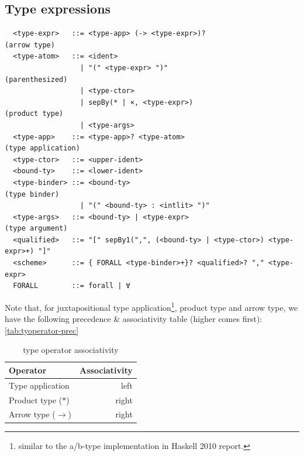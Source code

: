 \documentclass[a4paper, 11pt]{article}
\theoremstyle{remark}\newtheorem*{remark}{Remark}
\theoremstyle{definition}\newtheorem*{definition}{Definition}
\begin{document}
\subsection{Type expressions}
\begin{verbatim}
  <type-expr>   ::= <type-app> (-> <type-expr>)?                                 (arrow type)
  <type-atom>   ::= <ident>
                  | "(" <type-expr> ")"                                          (parenthesized)
                  | <type-ctor>
                  | sepBy(* | ×, <type-expr>)                                    (product type)
                  | <type-args>
  <type-app>    ::= <type-app>? <type-atom>                                      (type application)
  <type-ctor>   ::= <upper-ident>
  <bound-ty>    ::= <lower-ident>
  <type-binder> ::= <bound-ty>                                                   (type binder)
                  | "(" <bound-ty> : <intlit> ")"
  <type-args>   ::= <bound-ty> | <type-expr>                                     (type argument)
  <qualified>   ::= "[" sepBy1(",", (<bound-ty> | <type-ctor>) <type-expr>+) "]"
  <scheme>      ::= { FORALL <type-binder>+}? <qualified>? "," <type-expr>
  FORALL        ::= forall | ∀
\end{verbatim}
Note that, for juxtapositional type application\footnote{similar to the a/b-type implementation in Haskell 2010 report.},
product type and arrow type, we have the
following precedence \& associativity table (higher comes first): \autoref{tab:tyoperator-prec}
\begin{table}[]
  \centering
  \begin{tabular}{@{}lr@{}}
    \toprule
    Operator                     & Associativity \\ \midrule
    Type application             & left         \\
    Product type (\(\ast\))             & right         \\
    Arrow type (\(\to\)) & right \\ \bottomrule
  \end{tabular}
  \caption{type operator associativity}\label{tab:tyoperator-prec}
\end{table}
\end{document}
